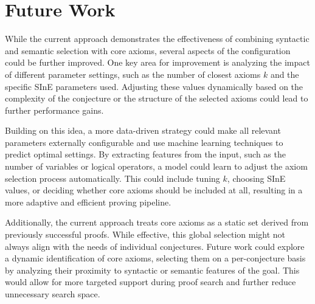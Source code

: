 \documentclass[english,version-2020-11]{uzl-thesis}
\begin{document}
\chapter{Future Work}
\label{chapter-futerwork}

While the current approach demonstrates the effectiveness of combining syntactic and semantic selection with core axioms, several aspects of the configuration could be further improved. One key area for improvement is analyzing the impact of different parameter settings, such as the number of closest axioms \( k \) and the specific SInE parameters used. Adjusting these values dynamically based on the complexity of the conjecture or the structure of the selected axioms could lead to further performance gains.

Building on this idea, a more data-driven strategy could make all relevant parameters externally configurable and use machine learning techniques to predict optimal settings. By extracting features from the input, such as the number of variables or logical operators, a model could learn to adjust the axiom selection process automatically. This could include tuning \( k \), choosing SInE values, or deciding whether core axioms should be included at all, resulting in a more adaptive and efficient proving pipeline.

Additionally, the current approach treats core axioms as a static set derived from previously successful proofs. While effective, this global selection might not always align with the needs of individual conjectures. Future work could explore a dynamic identification of core axioms, selecting them on a per-conjecture basis by analyzing their proximity to syntactic or semantic features of the goal. This would allow for more targeted support during proof search and further reduce unnecessary search space.


%
\end{document}
